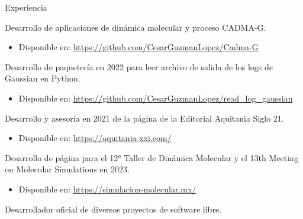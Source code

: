 \begin{rubric}{Experiencia}
\begin{itemize}
       \end{itemize}
    \entry*[] Desarrollo de aplicaciones de dinámica molecular y proceso CADMA-G.
       \begin{itemize}
           \item Disponible en: \url{https://github.com/CesarGuzmanLopez/Cadma-G}
       \end{itemize}
    \entry*[] Desarrollo de paquetería en 2022 para leer archivo de salida de los logs de Gaussian en Python.
       \begin{itemize}
           \item Disponible en: \url{https://github.com/CesarGuzmanLopez/read_log_gaussian}
       \end{itemize}
    \entry*[] Desarrollo y asesoría en 2021 de la página de la Editorial Aquitania Siglo 21.
       \begin{itemize}
           \item Disponible en: \url{https://aquitania-xxi.com/}
       \end{itemize}
    \entry*[] Desarrollo de página para el 12° Taller de Dinámica Molecular y el 13th Meeting on Molecular Simulations en 2023.
       \begin{itemize}
           \item Disponible en: \url{https://simulacion-molecular.mx/}
       \end{itemize}
    \entry*[] Desarrollador oficial de diversos proyectos de software libre.
\end{rubric}
